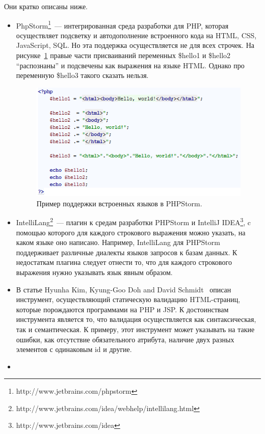 Они кратко описаны ниже. 
\begin{itemize}
\item
{
    PhpStorm\footnote{http://www.jetbrains.com/phpstorm}~--- интегрированная среда разработки для PHP, которая осуществляет подсветку и автодополнение встроенного кода на HTML, CSS, JavaScript, SQL. Но эта поддержка осуществляется не для всех строчек. На рисунке~\ref{PHPStorm} правые части присваиваний переменных \$hello1 и \$hello2 ``распознаны'' и подсвечены как выражения на языке HTML. Однако про переменную \$hello3 такого сказать нельзя.

\begin{figure}[t]
\centering
\includegraphics[width=\linewidth]{Ivanov/Pictures/PHPStorm.PNG}
\caption{Пример поддержки встроенных языков в PHPStorm.}
\label{PHPStorm}
\end{figure}
}
\item
{
    IntelliLang\footnote{http://www.jetbrains.com/idea/webhelp/intellilang.html}~--- плагин к средам разработки PHPStorm и IntelliJ IDEA\footnote{http://www.jetbrains.com/idea}, c помощью которого для каждого строкового выражения можно указать, на каком языке оно написано. Например, IntelliLang для PHPStorm поддерживает различные диалекты языков запросов к базам данных. К недостаткам плагина следует отнести то, что для каждого строкового выражения нужно указывать язык явным образом.
}
\item
{
В статье Hyunha Kim, Kyung-Goo Doh and David Schmidt~\cite{Kim} описан инструмент, осуществляющий статическую валидацию HTML-страниц, которые порождаются программами на PHP и JSP. К достоинствам инструмента является то, что валидация осуществляется как синтаксическая, так и семантическая. К примеру, этот инструмент может указывать на такие ошибки, как отсутствие обязательного атрибута, наличие двух разных элементов с одинаковым id и другие.
}
\item

\end{itemize}
